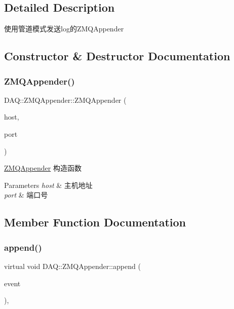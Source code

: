 \subsection{Detailed Description}
使用管道模式发送log的\+Z\+M\+Q\+Appender 

\subsection{Constructor \& Destructor Documentation}
\mbox{\label{classDAQ_1_1ZMQAppender_ab5078b0b11a62feda72cda2259524517}} 
\subsubsection{\texorpdfstring{Z\+M\+Q\+Appender()}{ZMQAppender()}}
{\footnotesize\ttfamily D\+A\+Q\+::\+Z\+M\+Q\+Appender\+::\+Z\+M\+Q\+Appender (\begin{DoxyParamCaption}\item[{const std\+::string \&}]{host,  }\item[{const std\+::string \&}]{port }\end{DoxyParamCaption})}



\hyperlink{classDAQ_1_1ZMQAppender}{Z\+M\+Q\+Appender} 构造函数 


\begin{DoxyParams}{Parameters}
{\em host} & 主机地址 \\
\hline
{\em port} & 端口号 \\
\hline
\end{DoxyParams}


\subsection{Member Function Documentation}
\mbox{\label{classDAQ_1_1ZMQAppender_a8dc33b1b2768e9e97438607a52b136d4}} 
\subsubsection{\texorpdfstring{append()}{append()}}
{\footnotesize\ttfamily virtual void D\+A\+Q\+::\+Z\+M\+Q\+Appender\+::append (\begin{DoxyParamCaption}\item[{Log\+Event\+::sptr}]{event }\end{DoxyParamCaption})\hspace{0.3cm}{\ttfamily [override]}, {\ttfamily [virtual]}}



